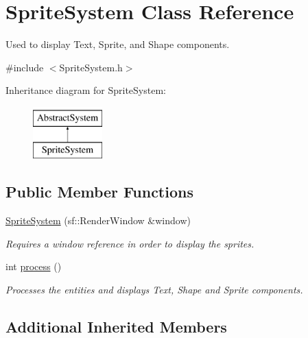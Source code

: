 \hypertarget{class_sprite_system}{\section{Sprite\-System Class Reference}
\label{d8/df1/class_sprite_system}
}


Used to display Text, Sprite, and Shape components.  




{\ttfamily \#include $<$Sprite\-System.\-h$>$}

Inheritance diagram for Sprite\-System\-:\begin{figure}[H]
\begin{center}
\leavevmode
\includegraphics[height=2.000000cm]{d8/df1/class_sprite_system}
\end{center}
\end{figure}
\subsection*{Public Member Functions}
\begin{DoxyCompactItemize}
\item 
\hyperlink{class_sprite_system_ae08866e84466a0b6564f2a67cca629c9}{Sprite\-System} (sf\-::\-Render\-Window \&window)
\begin{DoxyCompactList}\small\item\em Requires a window reference in order to display the sprites. \end{DoxyCompactList}\item 
\hypertarget{class_sprite_system_a0303dbb745168bbf0278e4f9a6b5be0c}{int \hyperlink{class_sprite_system_a0303dbb745168bbf0278e4f9a6b5be0c}{process} ()}\label{d8/df1/class_sprite_system_a0303dbb745168bbf0278e4f9a6b5be0c}

\begin{DoxyCompactList}\small\item\em Processes the entities and displays Text, Shape and Sprite components. \end{DoxyCompactList}\end{DoxyCompactItemize}
\subsection*{Additional Inherited Members}


